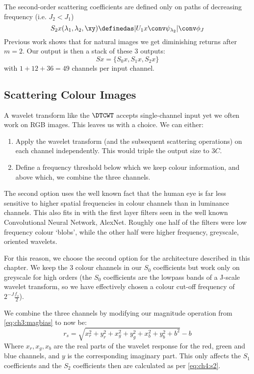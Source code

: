 The second-order scattering coefficients are defined only on paths of
decreasing frequency (i.e. $J_2 < J_{1}$) \cite{bruna_invariant_2013}
\begin{equation}
  S_2x(\lambda_1, \lambda_2, \xy) \definedas |U_1x \conv \psi_{\lambda_2}| \conv \phi_J \label{eq:ch4:s2}
\end{equation}
Previous work shows that for natural images we get diminishing returns after
$m=2$. Our output is then a stack of these 3 outputs:
\begin{equation}
  Sx = \{S_0x, S_1x, S_2x\}
\end{equation}
with $1+12+36=49$ channels per input channel.

\subsection{Scattering Colour Images}\label{sec:ch4:colour}
A wavelet transform like the $\DTCWT$ accepts single-channel input yet we
often work on RGB images. This leaves us with a choice. We can either:
\begin{enumerate}
  \item Apply the wavelet transform (and the subsequent scattering operations)
    on each channel independently. This would triple the output size to $3C$.
  \item Define a frequency threshold below which we keep colour information, and
    above which, we combine the three channels.
\end{enumerate}
The second option uses the well known fact that the human eye is far less sensitive
to higher spatial frequencies in colour channels than in luminance channels.
This also fits in with the first layer filters seen in the well known
Convolutional Neural Network, AlexNet. Roughly one half of the filters were low
frequency colour `blobs', while the other half were higher frequency, greyscale,
oriented wavelets.

For this reason, we choose the second option for the
architecture described in this chapter. We keep the 3 colour
channels in our $S_0$ coefficients but work only on greyscale for high orders
(the $S_0$ coefficients are the lowpass bands of a J-scale wavelet transform, so
we have effectively chosen a colour cut-off frequency of $2^{-J} \frac{f_s}{2}$).

We combine the three channels by modifying our magnitude operation from \eqref{eq:ch3:magbias}
to now be:
\begin{equation}\label{eq:ch4:colour_mag}
 r_s = \sqrt{x_r^2 + y_r^2 + x_g^2 + y_g^2 + x_b^2 + y_b^2 + b^2} - b
\end{equation}
Where $x_r, x_g, x_b$ are the real parts of the wavelet response for the red,
green and blue channels, and $y$ is the corresponding imaginary part. This only
affects the $S_1$ coefficients and the $S_2$ coefficients then are calculated
as per \eqref{eq:ch4:s2}.

